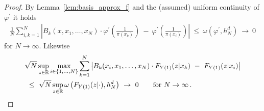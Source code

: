 \begin{proof}
  By Lemma~\ref{lem:basis_approx_f} 
  and the (assumed) uniform continuity of $\varphi^{'}$
  it holds
      \begin{align*}
        \frac
        {1}
        {N}
        \sum_{i,k=1}^{N}
            \left|
        B_k(x,x_1,\ldots,x_N)
        \cdot
            \varphi^{'}
            \left(
              \frac
              {1}
              {\pi(x_k)}
            \right)
            \ 
            -
            \ 
            \varphi^{'}
            \left(
              \frac
              {1}
              {\pi(x_i)}
            \right)
            \right|
            \ 
            \le
            \ 
   \omega
   \left(
     \varphi^{'},h_N^d
   \right)
            \ 
            \to
            \ 
            0
          \end{align*}
          for $N\to\infty$.
          Likewise
\begin{align*}
  &
        \sqrt{N}
        \sup_{z\in\R}
        \max_{i\in \left\{ 1,\ldots,N \right\}}
        \sum_{k=1}^{N}
            \left|
        B_k(x_i,x_1,\ldots,x_N)
        \cdot
        F_{Y(1)}(z|x_k)
            \ 
            -
            \ 
        F_{Y(1)}(z|x_i)
          \right|
             \\
            &
            \ 
            \le
            \ 
            \sqrt{N}
            \sup_{z\in\R}
            \omega
            \left(
        F_{Y(1)}(z|\cdot)
        ,
        h_N^d
            \right)
            \ 
            \to
            \ 
            0
            \qquad
            \text{for}
            \ 
            N\to\infty
            \,.
\end{align*}
        \end{proof}

